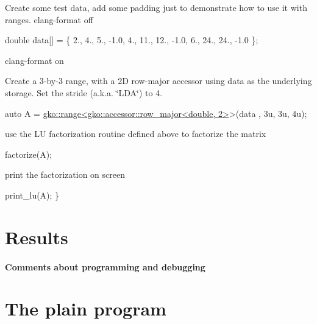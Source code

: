 Create some test data, add some padding just to demonstrate how to use it with ranges. clang-\/format off


\begin{DoxyCode}
\textcolor{keywordtype}{double} data[] = \{
    2.,  4.,  5., -1.0,
    4., 11., 12., -1.0,
    6., 24., 24., -1.0
\};
\end{DoxyCode}


clang-\/format on

Create a 3-\/by-\/3 range, with a 2D row-\/major accessor using data as the underlying storage. Set the stride (a.\+k.\+a. \char`\"{}\+L\+D\+A\char`\"{}) to 4.


\begin{DoxyCode}
\textcolor{keyword}{auto} A = \hyperlink{classgko_1_1range}{gko::range<gko::accessor::row\_major<double, 2>}>(data
      , 3u, 3u, 4u);
\end{DoxyCode}


use the LU factorization routine defined above to factorize the matrix


\begin{DoxyCode}
factorize(A);
\end{DoxyCode}


print the factorization on screen


\begin{DoxyCode}
    print\_lu(A);
\}
\end{DoxyCode}
 \label{_Results}%
\section*{Results}

\label{_Commentsaboutprogramminganddebugging}%
\paragraph*{Comments about programming and debugging }

\label{_PlainProg}%
 \section*{The plain program}


\begin{DoxyCodeInclude}
\end{DoxyCodeInclude}
 